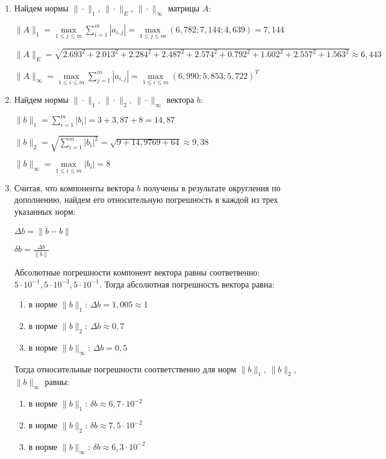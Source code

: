 \documentclass[a4paper,12pt]{article} %
\begin{document}
\begin{enumerate}

\item Найдем нормы $\|\cdot\|_1$, $\|\cdot\|_E$, $\|\cdot\|_\infty$ матрицы $A$:

$\|A\|_1 = \max\limits_{{1 \leq j \leq m}} \sum\limits_{i = 1}^{m}|a_{i, j}| = \max\limits_{{1 \leq j \leq m}} (6,782; 7,144; 4,639) = 7,144$

$\|A\|_E = \sqrt{2.693^2 + 2.013^2 + 2.284^2 + 2.487^2 + 2.574^2 + 0.792^2 + 1.602^2 + 2.557^2 + 1.563^2} \approx 6,443$

$\|A\|_\infty = \max\limits_{{1 \leq i \leq m}} \sum\limits_{j = 1}^{m}|a_{i, j}| = \max\limits_{{1 \leq i \leq m}} (6,990; 5,853; 5,722)^T$


\item Найдем нормы $\|\cdot\|_1$, $\|\cdot\|_2$, $\|\cdot\|_\infty$ вектора $b$:

$\|b\|_1 = \sum\limits_{i = 1}^{m}|b_i| = 3 + 3,87 + 8 = 14,87$

$\|b\|_2 = \sqrt{\sum\limits_{i = 1}^{m}|b_i|^2} = \sqrt{9 + 14,9769 + 64} \approx 9,38$

$\|b\|_\infty = \max\limits_{{1 \leq i \leq m}}|b_i| = 8$

\newpage

\item Считая, что компоненты вектора $b$ получены в результате округления по дополнению, найдем его относительную погрешность в каждой из трех указанных норм:

$\Delta b = \|\overline{b} - b\|$

$\delta b = \frac{\Delta b}{\|\overline{b}\|}$

Абсолютные погрешности компонент вектора равны соответвенно: $5 \cdot 10^{-1}, 5 \cdot 10^{-3}, 5 \cdot 10^{-1}$. Тогда абсолютная погрешность вектора равна:

\begin{enumerate}
    \item в норме $\|b\|_1$: $\Delta b = 1,005 \approx 1$
    \item в норме $\|b\|_2$: $\Delta b \approx 0,7$
    \item в норме $\|b\|_\infty$: $\Delta b = 0,5$
\end{enumerate}

Тогда относительные погрешности соответственно для норм $\|b\|_1$, $\|b\|_2$, $\|b\|_\infty$ равны:

\begin{enumerate}
    \item в норме $\|b\|_1$: $\delta b \approx 6,7 \cdot 10^{-2}$
    \item в норме $\|b\|_2$: $\delta b \approx 7,5 \cdot 10^{-2}$
    \item в норме $\|b\|_\infty$: $\delta b \approx 6,3 \cdot 10^{-2} $
\end{enumerate}



\end{enumerate}
\end{document}
